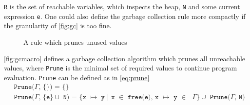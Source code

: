 \texttt{R} is the set of reachable variables, which inspects the heap, \texttt{N} and some current expression \texttt{e}.
One could also define the garbage collection rule more compactly if the granularity of \autoref{fig:gc} is too fine.
\begin{figure}[ht]
  \begin{mdframed}
    \begin{prooftree}
    \end{prooftree}   
  \end{mdframed}
  \caption{A rule which prunes unused values}
  \label{fig:gcmacro}
\end{figure}
\autoref{fig:gcmacro} defines a garbage collection algorithm which prunes all unreachable values, where \texttt{Prune} is the minimal set of required values to continue program evaluation.
\texttt{Prune} can be defined as in \autoref{eq:prune}
\begin{align}
  &\texttt{Prune($\Gamma$, \{\}) = \{\}} \label{eq:prune}\\
  &\texttt{Prune($\Gamma$, \{e\} $\cup$ N) = \{x $\mapsto$ y | x $\in$ free(e), x $\mapsto$ y $\in$ $\Gamma$\} $\cup$ Prune($\Gamma$, N)} \tag*{}
\end{align}

